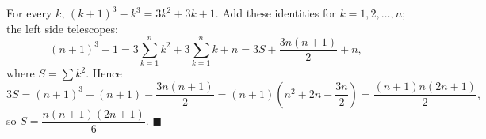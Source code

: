 For every $k$, $(k+1)^3-k^3=3k^2+3k+1$. Add these identities for $k=1,2,\dots,n$; the left side telescopes:
\[(n+1)^3-1=3\sum_{k=1}^n k^2+3\sum_{k=1}^n k+n=3S+\dfrac{3n(n+1)}{2}+n,\]
where $S=\sum k^2$. Hence
\[3S=(n+1)^3-(n+1)-\dfrac{3n(n+1)}{2}=(n+1)\left(n^2+2n-\dfrac{3n}{2}\right)=\dfrac{(n+1)n(2n+1)}{2},\]
so $S=\dfrac{n(n+1)(2n+1)}{6}$. $\blacksquare$
